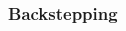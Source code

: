 %
\begin{frame}
\frametitle{Backstepping}
%
\begin{columns}
	\begin{column}{0.5\textwidth}
	\begin{figure}
	\end{figure}
	\end{column}
	\begin{column}{0.5\textwidth}
	\begin{figure}
	\end{figure}
	\end{column}
\end{columns}
\end{frame}
%
%
